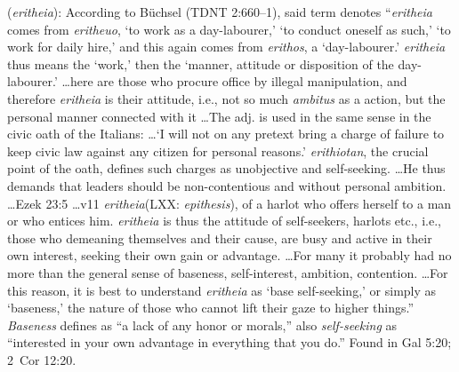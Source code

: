 \item[Self-seeking,]

(\textit{eritheia}):
According to Büchsel (TDNT 2:660--1), said term denotes ``\emph{eritheia} comes from \emph{eritheuo}, `to work as a day-labourer,' `to conduct oneself as such,' `to work for daily hire,' and this again comes from \emph{erithos}, a `day-labourer.' \emph{eritheia} thus means the `work,' then the `manner, attitude or disposition of the day-labourer.' \ldots here are those who procure office by illegal manipulation, and therefore \emph{eritheia} is their attitude, i.e., not so much \emph{ambitus} as a action, but the personal manner connected with it \ldots The adj. is used in the same sense in the civic oath of the Italians: \ldots `I will not on any pretext bring a charge of failure to keep civic law against any citizen for personal reasons.' \emph{erithiotan}, the crucial point of the oath, defines such charges as unobjective and self-seeking. \ldots He thus demands that leaders should be non-contentious and without personal ambition. \ldots Ezek 23:5 \ldots v11 \emph{eritheia}(LXX: \emph{epithesis}),  of a harlot who offers herself to a man or who entices him. \emph{eritheia} is thus the attitude of self-seekers, harlots etc., i.e., those who demeaning themselves and their cause, are busy and active in their own interest, seeking their own gain or advantage. \ldots For many it probably had no more than the general sense of baseness, self-interest, ambition, contention. \ldots For this reason, it is best to understand \emph{eritheia} as `base self-seeking,' or simply as `baseness,' the nature of those who cannot lift their gaze to higher things.'' \emph{Baseness} defines as ``a lack of any honor or morals,'' also \emph{self-seeking} as ``interested in your own advantage in everything that you do.''
Found in Gal 5:20; 2~Cor 12:20.
